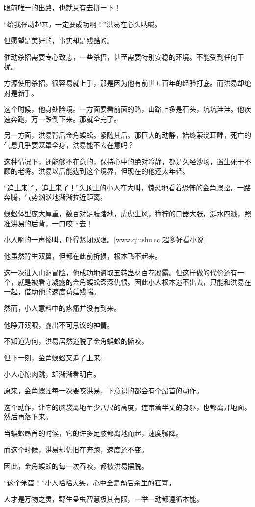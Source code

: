 \begin{this_body}
眼前唯一的出路，也就只有去拼一下！

“给我催动起来，一定要成功啊！”洪易在心头呐喊。

但愿望是美好的，事实却是残酷的。

催动杀招需要专心致志，一些杀招，甚至需要特别安稳的环境。不能受到任何干扰。

方源使用杀招，很容易就上手，那是因为他有前世五百年的经验打底。而洪易却绝对是新手。

这个时候，他身处险境。一方面要看前面的路，山路上多是石头，坑坑洼洼。他疾速奔跑，万一跌倒下来。那就全完了。

另一方面，洪易背后金角蜈蚣。紧随其后。那巨大的动静，始终萦绕耳畔，死亡的气息几乎要笼罩全身，洪易能不去在意吗？

这种情况下，还能够不在意的，保持心中的绝对冷静，都是久经沙场，置生死于不顾的老将。洪易以后能达到这个境界，但现在的他还太年轻。

“追上来了，追上来了！”头顶上的小人在大叫，惊恐地看着恐怖的金角蜈蚣，一路奔腾，气势汹汹地渐渐拉近距离。

蜈蚣体型庞大厚重，数百对足肢踏地，虎虎生风，狰狞的口器大张，涎水四溅，照准洪易的后背，一口咬下去！

小人啊的一声惨叫，吓得紧闭双眼。[www.qiushu.cc 超多好看小说]

他虽然背生双翼，但都在此前折损，根本飞不起来。

这一次进入山洞冒险，他成功地盗取五转蛊材百花凝露。但这样做的代价还有一个，就是被看守凝露的金角蜈蚣深深仇恨。因此小人根本逃不出去，只能和洪易在一起，借助他的速度苟延残喘。

然而，小人意料中的疼痛并没有到来。

他睁开双眼，露出不可思议的神情。

不知道为何，洪易居然逃脱了金角蜈蚣的撕咬。

但下一刻，金角蜈蚣又追了上来。

小人心惊肉跳，却渐渐看明白。

原来，金角蜈蚣每一次要咬洪易，下意识的都会有个昂首的动作。

这个动作，让它的脑袋离地至少八尺的高度，连带着半丈的身躯，也都离开地面。然后再落下来。

当蜈蚣昂首的时候，它的许多足肢都离地而起，速度骤降。

而这个时候，洪易却仍旧在奔跑，速度还不变。

因此，金角蜈蚣的每一次吞咬，都被洪易摆脱。

“这个笨蛋！”小人哈哈大笑，心中全是劫后余生的狂喜。

人才是万物之灵，野生蛊虫智慧极其有限，一举一动都遵循本能。


\end{this_body}
